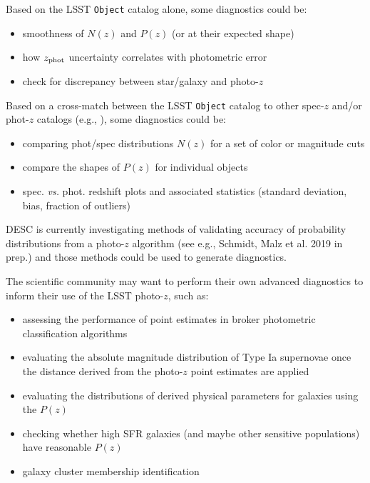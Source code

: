 \documentclass[DM,lsstdraft,toc]{lsstdoc}
\begin{document}
Based on the LSST {\tt Object} catalog alone, some diagnostics could be:
\begin{itemize}[noitemsep,topsep=-10pt]
\item smoothness of $N(z)$ and $P(z)$ (or at their expected shape)
\item how $z_{\rm phot}$ uncertainty correlates with photometric error
\item check for discrepancy between star/galaxy and photo-$z$
\end{itemize}

Based on a cross-match between the LSST {\tt Object} catalog to other spec-$z$ and/or phot-$z$ catalogs (e.g., \citealt{2019MNRAS.488.4565Z}), some diagnostics could be:
\begin{itemize}[noitemsep,topsep=-10pt]
\item comparing phot/spec distributions $N(z)$ for a set of color or magnitude cuts
\item compare the shapes of $P(z)$ for individual objects
\item spec. {\it vs.} phot. redshift plots and associated statistics (standard deviation, bias, fraction of outliers)
\end{itemize}

DESC is currently investigating methods of validating accuracy of probability distributions from a photo-$z$ algorithm (see e.g., Schmidt, Malz et al. 2019 in prep.) and those methods could be used to generate diagnostics.

The scientific community may want to perform their own advanced diagnostics to inform their use of the LSST photo-$z$, such as:
\begin{itemize}[noitemsep,topsep=-10pt]
\item assessing the performance of point estimates in broker photometric classification algorithms
\item evaluating the absolute magnitude distribution of Type Ia supernovae once the distance derived from the photo-$z$ point estimates are applied
\item evaluating the distributions of derived physical parameters for galaxies using the $P(z)$
\item checking whether high SFR galaxies (and maybe other sensitive populations) have reasonable $P(z)$
\item galaxy cluster membership identification
\end{itemize}
\end{document}
